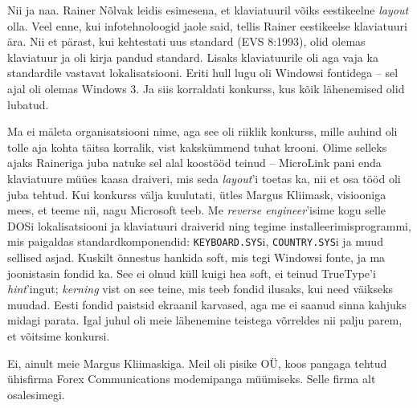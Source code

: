 
Nii ja naa. Rainer Nõlvak leidis esimesena, et klaviatuuril võiks eestikeelne \emph{layout} 
olla. Veel enne, kui infotehnoloogid jaole said, tellis Rainer eestikeelse 
klaviatuuri ära.  Nii et pärast, kui kehtestati  uus standard (EVS 8:1993),  
olid olemas klaviatuur ja oli kirja pandud standard. Lisaks klaviatuurile oli aga vaja ka standardile vastavat 
lokalisatsiooni. Eriti hull lugu oli Windowsi fontidega -- sel ajal oli olemas
Windows 3. Ja siis korraldati konkurss, kus kõik lähenemised 
olid lubatud.


Ma ei mäleta organisatsiooni nime, aga see oli riiklik 
konkurss, mille auhind oli tolle aja kohta täitsa korralik, vist kakskümmend 
tuhat krooni. Olime selleks ajaks Raineriga juba natuke sel alal 
koostööd teinud -- MicroLink pani enda klaviatuure müües kaasa draiveri, mis seda 
\emph{layout}'i toetas ka, nii et osa tööd oli juba tehtud. Kui konkurss 
välja kuulutati, ütles Margus Kliimask, visiooniga mees,
et teeme nii, nagu Microsoft teeb. Me \emph{reverse 
engineer}'isime kogu selle DOSi lokalisatsiooni ja klaviatuuri draiverid ning 
tegime installeerimisprogrammi, mis paigaldas 
standardkomponendid: \verb|KEYBOARD.SYS|i, \verb|COUNTRY.SYS|i ja muud
sellised asjad. Kuskilt õnnestus hankida soft, mis tegi Windowsi 
fonte, ja ma joonistasin fondid ka. See ei olnud küll kuigi hea soft, 
ei teinud TrueType'i \emph{hint}'ingut; \emph{kerning} vist 
on see teine, mis teeb fondid ilusaks, kui need väikseks muudad. Eesti 
fondid paistsid ekraanil karvased, aga me ei saanud sinna kahjuks midagi parata. Igal juhul
oli meie lähenemine teistega võrreldes nii palju parem, et võitsime konkursi.


Ei, ainult meie Margus Kliimaskiga. 
Meil oli pisike OÜ, koos pangaga tehtud ühisfirma Forex Communications modemipanga müümiseks. 
Selle firma alt osalesimegi. 


